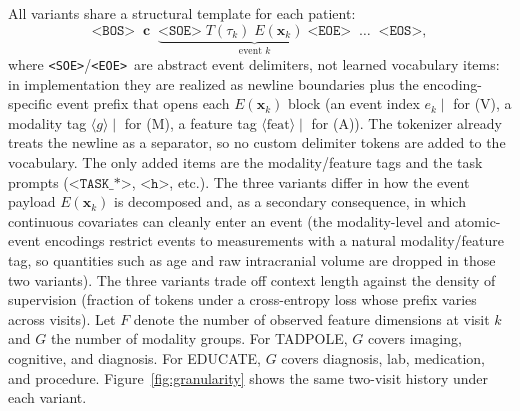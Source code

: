 \documentclass{article}
\newcommand{\soe}{\texttt{<SOE>}}
\newcommand{\eoe}{\texttt{<EOE>}}
\newcommand{\bos}{\texttt{<BOS>}}
\newcommand{\eos}{\texttt{<EOS>}}
\newcommand{\ttoken}[1]{\texttt{<#1>}}
\begin{document}
All variants share a structural template for each patient:
\begin{equation}
    \bos \;\; \mathbf{c} \;\;
    \underbrace{\soe \; T(\tau_k) \; E(\mathbf{x}_k) \; \eoe}_{\text{event } k} \;\;
    \ldots \;\;
    \eos,
    \label{eq:template}
\end{equation}
where \soe/\eoe\ are abstract event delimiters, not learned vocabulary items: in implementation they are realized as newline boundaries plus the encoding-specific event prefix that opens each $E(\mathbf{x}_k)$ block (an event index $e_k\mid$ for (V), a modality tag $\langle g\rangle\mid$ for (M), a feature tag $\langle\text{feat}\rangle\mid$ for (A)).
The tokenizer already treats the newline as a separator, so no custom delimiter tokens are added to the vocabulary. The only added items are the modality/feature tags and the task prompts ($\ttoken{TASK\_*}$, $\ttoken{h}$, etc.).
The three variants differ in how the event payload $E(\mathbf{x}_k)$ is decomposed and, as a secondary consequence, in which continuous covariates can cleanly enter an event (the modality-level and atomic-event encodings restrict events to measurements with a natural modality/feature tag, so quantities such as age and raw intracranial volume are dropped in those two variants).
The three variants trade off context length against the density of supervision (fraction of tokens under a cross-entropy loss whose prefix varies across visits).
Let $F$ denote the number of observed feature dimensions at visit $k$ and $G$ the number of modality groups. For TADPOLE, $G$ covers imaging, cognitive, and diagnosis. For EDUCATE, $G$ covers diagnosis, lab, medication, and procedure.
Figure~\ref{fig:granularity} shows the same two-visit history under each variant.
\end{document}
